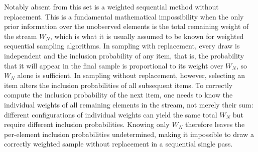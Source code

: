 \documentclass{juliacon}
\begin{document}
Notably absent from this set is a weighted sequential method without replacement. This is a fundamental mathematical impossibility when the only prior information over the unobserved elements is the total remaining weight of the stream $W_N$, which is what it is usually assumed to be known for weighted sequential sampling algorithms. In sampling with replacement, every draw is independent and the inclusion probability of any item, that is, the probability that it will appear in the final sample is proportional to its weight over $W_N$, so $W_N$ alone is sufficient. In sampling without replacement, however, selecting an item alters the inclusion probabilities of all subsequent items. To correctly compute the inclusion probability of the next item, one needs to know the individual weights of all remaining elements in the stream, not merely their sum: different configurations of individual weights can yield the same total $W_N$ but require different inclusion probabilities. Knowing only $W_N$ therefore leaves the per-element inclusion probabilities undetermined, making it impossible to draw a correctly weighted sample without replacement in a sequential single pass.
\end{document}

